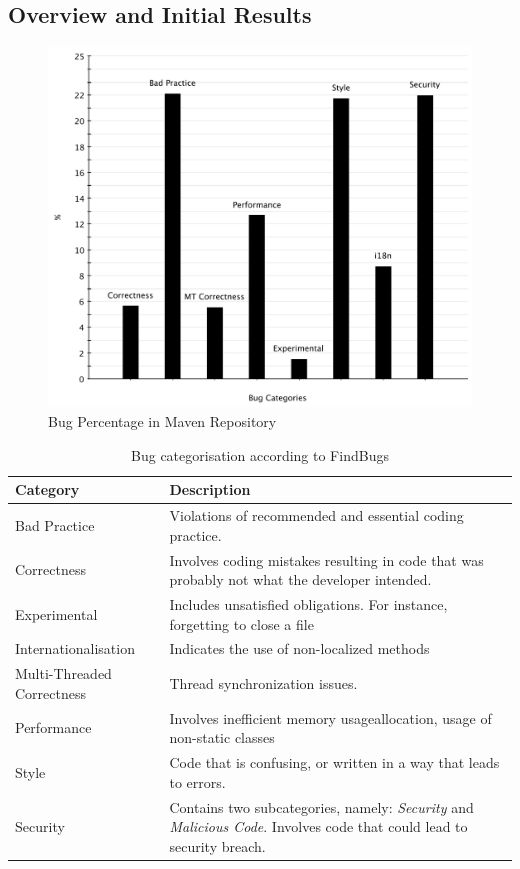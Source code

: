 \documentclass[conference]{IEEEtran}
\begin{document}
\subsection{Overview and Initial Results}
\label{sec:overview}

\begin{figure}
	\centering
	\includegraphics[scale=0.6]{bug_percent}
	\caption{Bug Percentage in Maven Repository}
	\label{fig:bug-percentage}
\end{figure}

\begin{table}
\centering
\caption{Bug categorisation according to FindBugs}
\label{tbl:bug-categorisation}
\begin{tabular}{l p{15em}}
\hline
Category & Description\\
\hline
Bad Practice & Violations of recommended and essential
coding practice. \\
Correctness & Involves coding mistakes resulting in code
that was probably not what the developer intended. \\
Experimental & Includes unsatisfied obligations. For instance,
forgetting to close a file \\
Internationalisation & Indicates the use of non-localized methods \\
Multi-Threaded Correctness & Thread synchronization issues. \\
Performance & Involves inefficient memory usageallocation, usage 
of non-static classes \\
Style & Code that is confusing, or
written in a way that leads to errors.\\
Security & Contains two subcategories, namely: {\it Security} and {\it
Malicious Code}. Involves code that could lead to security breach. \\
\hline
\end{tabular}
\end{table}
\end{document}
